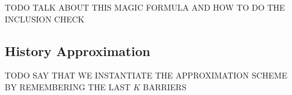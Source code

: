 TODO TALK ABOUT THIS MAGIC FORMULA AND HOW TO DO THE INCLUSION CHECK






\subsection{History Approximation}
\label{sec:counting:approx}

TODO SAY THAT WE INSTANTIATE THE APPROXIMATION SCHEME BY REMEMBERING THE LAST
$K$ BARRIERS
